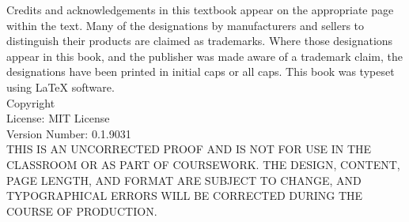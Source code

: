 \documentclass{book}
\makeatletter
\newcommand{\booklicense}{MIT License}
\newcommand{\bookversion}{0.1.9031}
\newcommand{\bookauthor}{\@author}
\makeatother
\begin{document}
\thispagestyle{empty}

\setcounter{page}{1}
\renewcommand{\thepage}{Colophon \arabic{page}}

\begin{flushleft}
\vspace*{\fill}
Credits and acknowledgements in this textbook appear on the appropriate page within the text.
\newline
\newline
Many of the designations by manufacturers and sellers to distinguish their products are claimed as trademarks. Where those designations appear in this book, and the publisher was made aware of a trademark claim, the designations have been printed in initial caps or all caps.
\newline
\newline
This book was typeset using \LaTeX{} software.\\
\vspace{\fill}
Copyright \textcopyright{} \the\year{}  \bookauthor\\
License: \booklicense\\
Version Number: \bookversion\\
\vspace{1cm}
THIS IS AN UNCORRECTED PROOF AND IS NOT FOR USE IN THE CLASSROOM OR AS PART OF COURSEWORK. THE DESIGN, CONTENT, PAGE LENGTH, AND FORMAT ARE SUBJECT TO CHANGE, AND TYPOGRAPHICAL ERRORS WILL BE CORRECTED DURING THE COURSE OF PRODUCTION.
\end{flushleft}

\setcounter{page}{1}
\renewcommand{\thepage}{\roman{page}}



\newpage

\setcounter{page}{1}
\renewcommand{\thepage}{TOC \roman{page}}
\setcounter{tocdepth}{3}
\tableofcontents

\mainmatter

\setcounter{page}{9}
\renewcommand{\thepage}{\arabic{page}}








\end{document}
